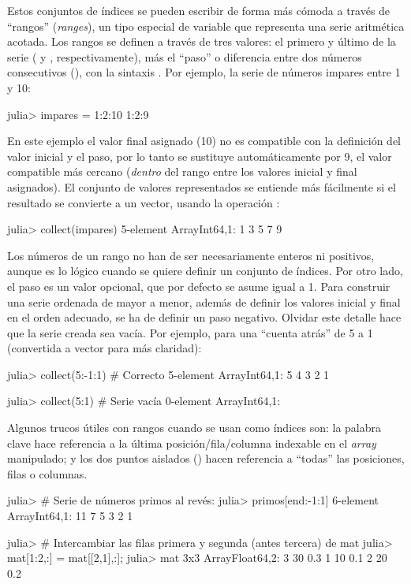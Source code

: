 Estos conjuntos de índices se pueden escribir de forma más cómoda a través de ``rangos'' (\emph{ranges}), un tipo especial de variable que representa una serie aritmética acotada. Los rangos se definen a través de tres valores: el primero y último de la serie ( y , respectivamente), más el ``paso'' o diferencia entre dos números consecutivos (), con la sintaxis . Por ejemplo, la serie de números impares entre 1 y 10:

\begin{jlconcode}
julia> impares = 1:2:10
1:2:9
\end{jlconcode}
En este ejemplo el valor final asignado (10) no es compatible con la definición del valor inicial y el paso, por lo tanto se sustituye automáticamente por 9, el valor compatible más cercano (\emph{dentro} del rango entre los valores inicial y final asignados). El conjunto de valores representados se entiende más fácilmente si el resultado se convierte a un vector, usando la operación :

\begin{jlconcode}
julia> collect(impares)
5-element Array{Int64,1}:
 1
 3
 5
 7
 9
\end{jlconcode}

Los números de un rango no han de ser necesariamente enteros ni positivos, aunque es lo lógico cuando se quiere definir un conjunto de índices. Por otro lado, el paso  es un valor opcional, que por defecto se asume igual a 1. Para construir una serie ordenada de mayor a menor, además de definir los valores inicial y final en el orden adecuado, se ha de definir un paso negativo. Olvidar este detalle hace que la serie creada sea vacía. Por ejemplo, para una ``cuenta atrás'' de 5 a 1 (convertida a vector para más claridad):

\begin{jlconcode}
julia> collect(5:-1:1) # Correcto
5-element Array{Int64,1}:
 5
 4
 3
 2
 1 

julia> collect(5:1) # Serie vacía
0-element Array{Int64,1}:
\end{jlconcode}

Algunos trucos útiles con rangos cuando se usan como índices son: la palabra clave  hace referencia a la última posición/fila/columna indexable en el \emph{array} manipulado; y los dos puntos aislados (\code{:}) hacen referencia a ``todas'' las posiciones, filas o columnas.

\begin{jlconcode}
julia> # Serie de números primos al revés:
julia> primos[end:-1:1]
6-element Array{Int64,1}:
 11
 7
 5
 3
 2
 1

julia> # Intercambiar las filas primera y segunda (antes tercera) de mat
julia> mat[1:2,:] = mat[[2,1],:];
julia> mat
3x3 Array{Float64,2}:
 3 30 0.3
 1 10 0.1
 2 20 0.2
\end{jlconcode}

